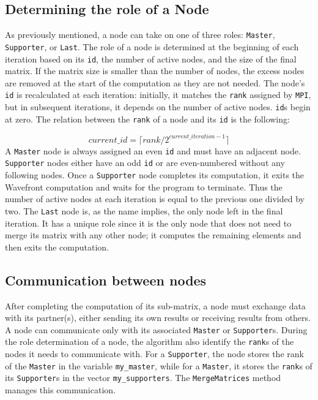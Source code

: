 \subsection*{Determining the role of a Node}
As previously mentioned, a node can take on one of three roles: \texttt{Master}, \texttt{Supporter}, or \texttt{Last}. The role of a node is determined at the beginning of each iteration based on its \texttt{id}, the number of active nodes, and the size of the final matrix. If the matrix size is smaller than the number of nodes, the excess nodes are removed at the start of the computation as they are not needed. The node's \texttt{id} is recalculated at each iteration: initially, it matches the \texttt{rank} assigned by \texttt{MPI}, but in subsequent iterations, it depends on the number of active nodes. \texttt{id}s begin at zero. The relation between the \texttt{rank} of a node and its \texttt{id} is the following:

\begin{equation}
    current\_id = \lceil rank / 2^{current\_iteration - 1}\rceil
\end{equation}
A \texttt{Master} node is always assigned an even \texttt{id} and must have an adjacent node. \texttt{Supporter} nodes either have an odd \texttt{id} or are even-numbered without any following nodes. Once a \texttt{Supporter} node completes its computation, it exits the Wavefront computation and waits for the program to terminate. Thus the number of active nodes at each iteration is equal to the previous one divided by two. The \texttt{Last} node is, as the name implies, the only node left in the final iteration. It has a unique role since it is the only node that does not need to merge its matrix with any other node; it computes the remaining elements and then exits the computation.

\subsection*{Communication between nodes}
After completing the computation of its sub-matrix, a node must exchange data with its partner(s), either sending its own results or receiving results from others. A node can communicate only with its associated \texttt{Master} or \texttt{Supporter}s. During the role determination of a node, the algorithm also identify the \texttt{rank}s of the nodes it needs to communicate with. For a \texttt{Supporter}, the node stores the rank of the \texttt{Master} in the variable \texttt{my\_master}, while for a \texttt{Master}, it stores the \texttt{rank}s of its \texttt{Supporter}s in the vector \texttt{my\_supporters}. The \texttt{MergeMatrices} method manages this communication.


